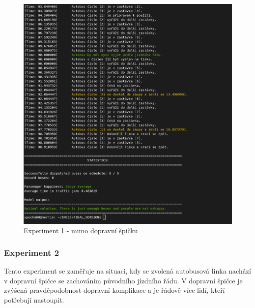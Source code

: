 \documentclass[a4paper]{article}
\begin{document}
                \begin{figure}[H]
                \includegraphics[scale=0.45, keepaspectratio]{fig/ims_bus1.png}
                \caption{Experiment 1 - mimo dopravní špičku}
                \label{fig:experiment1}
            \end{figure}
        \newpage
            \subsubsection{Experiment 2}
            \label{subsubsec:experiment2}
				Tento experiment se zaměřuje na situaci, kdy se zvolená autobusová linka nachází v dopravní špičce se zachováním původního jízdního řádu. V dopravní špičce je zvýšená pravděpodobnost dopravní komplikace a je řádově více lidí, kteří potřebují nastoupit.

                \begin{table}[H]
                    \centering
                    \caption{Parametry experimentu 2}
                    \label{tab:experiment2}
                \end{table}
\end{document}
